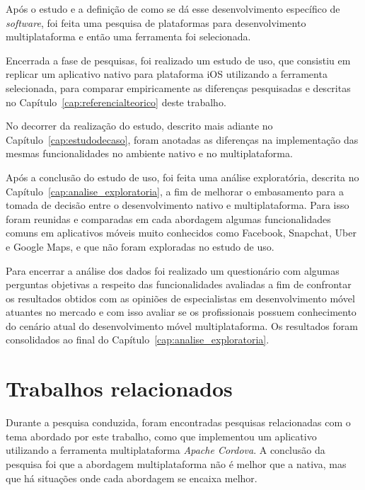 Após o estudo e a definição de como se dá esse desenvolvimento específico de \textit{software},
foi feita uma pesquisa de plataformas para desenvolvimento multiplataforma e então uma ferramenta foi selecionada. 

Encerrada a fase de pesquisas, foi realizado um estudo de uso, que consistiu em replicar um aplicativo nativo para plataforma iOS utilizando a ferramenta selecionada, 
para comparar empiricamente as diferenças pesquisadas e descritas no Capítulo~\ref{cap:referencialteorico} deste trabalho.

No decorrer da realização do estudo, descrito mais adiante no Capítulo~\ref{cap:estudodecaso}, foram anotadas as diferenças na implementação das mesmas funcionalidades no ambiente nativo e no 
multiplataforma.

Após a conclusão do estudo de uso, foi feita uma análise exploratória, descrita no Capítulo~\ref{cap:analise_exploratoria}, 
a fim de melhorar o embasamento para a tomada de decisão entre o desenvolvimento 
nativo e multiplataforma. Para isso foram reunidas e comparadas em cada abordagem algumas funcionalidades comuns em aplicativos 
móveis muito conhecidos como Facebook, Snapchat, Uber e Google Maps, e que não foram exploradas no estudo de uso. 

Para encerrar a análise dos dados foi realizado um questionário com algumas perguntas objetivas a respeito das funcionalidades avaliadas a fim de confrontar os resultados obtidos com as opiniões de especialistas em 
desenvolvimento móvel atuantes no mercado e com isso avaliar se os profissionais possuem conhecimento do cenário atual do desenvolvimento móvel multiplataforma. Os resultados foram consolidados ao final do 
Capítulo~\ref{cap:analise_exploratoria}.


\section{Trabalhos relacionados} \label{sec:trabalhosrelacionados}

Durante a pesquisa conduzida, foram encontradas pesquisas relacionadas com o tema abordado por este trabalho, como 
que implementou um aplicativo utilizando a ferramenta multiplataforma \textit{Apache Cordova}. A conclusão da pesquisa foi 
que a abordagem multiplataforma não é melhor que a nativa, mas que há situações onde cada abordagem se encaixa melhor.

